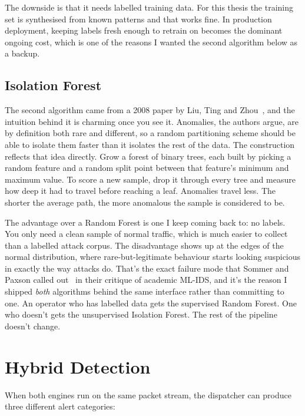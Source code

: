The downside is that it needs labelled training data. For this
thesis the training set is synthesised from known patterns and
that works fine. In production deployment, keeping labels
fresh enough to retrain on becomes the dominant ongoing cost,
which is one of the reasons I wanted the second algorithm
below as a backup.

\subsection{Isolation Forest}
\label{sec:bg-iforest}

The second algorithm came from a 2008 paper by Liu, Ting and
Zhou~\cite{liu2008isolation}, and the intuition behind it is
charming once you see it. Anomalies, the authors argue, are by
definition both rare and different, so a random partitioning
scheme should be able to isolate them faster than it isolates
the rest of the data. The construction reflects that idea
directly. Grow a forest of binary trees, each built by picking
a random feature and a random split point between that
feature's minimum and maximum value. To score a new sample,
drop it through every tree and measure how deep it had to
travel before reaching a leaf. Anomalies travel less. The
shorter the average path, the more anomalous the sample is
considered to be.

The advantage over a Random Forest is one I keep coming back
to: no labels. You only need a clean sample of normal traffic,
which is much easier to collect than a labelled attack corpus.
The disadvantage shows up at the edges of the normal
distribution, where rare-but-legitimate behaviour starts
looking suspicious in exactly the way attacks do. That's the
exact failure mode that Sommer and Paxson called
out~\cite{sommer2010outside} in their critique of academic
ML-IDS, and it's the reason I shipped \emph{both} algorithms
behind the same interface rather than committing to one. An
operator who has labelled data gets the supervised Random
Forest. One who doesn't gets the unsupervised Isolation
Forest. The rest of the pipeline doesn't change.

\section{Hybrid Detection}
\label{sec:bg-hybrid}

When both engines run on the same packet stream, the dispatcher can
produce three different alert categories:


